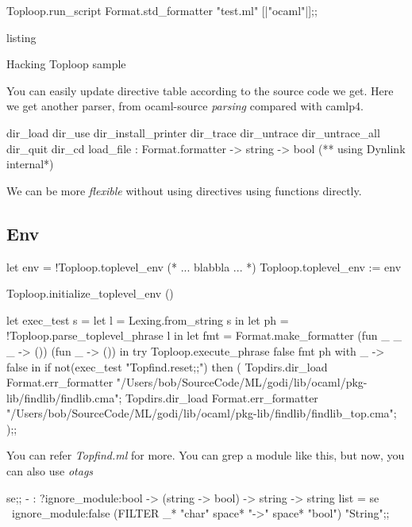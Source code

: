 \begin{ocamlcode}
Toploop.run_script Format.std_formatter "test.ml" [|"ocaml"|];;
\end{ocamlcode}
\caption{listing}{Hacking Toploop sample}

You can easily update directive table according to the source code we
get. Here we get another parser, from ocaml-source \textit{parsing}
compared with camlp4.

\begin{ocamlcode}
  dir_load
  dir_use
  dir_install_printer
  dir_trace
  dir_untrace
  dir_untrace_all
  dir_quit
  dir_cd 
  load_file : Format.formatter -> string -> bool  (** using Dynlink internal*)
\end{ocamlcode}
We can be more \textit{flexible} without using directives using functions directly.


\subsection{Env}

  \begin{ocamlcode}
    let env = !Toploop.toplevel_env
    (* ... blabbla ...     *)
    Toploop.toplevel_env := env  
  \end{ocamlcode}
  
  \begin{ocamlcode}
    Toploop.initialize_toplevel_env ()  
  \end{ocamlcode}


\begin{ocamlcode}
let exec_test s =
  let l = Lexing.from_string s in
  let ph = !Toploop.parse_toplevel_phrase l in
  let fmt = Format.make_formatter (fun _ _ _ -> ()) (fun _ -> ()) in
  try
    Toploop.execute_phrase false fmt ph
  with
      _ -> false
in
if not(exec_test "Topfind.reset;;") then (
  Topdirs.dir_load Format.err_formatter "/Users/bob/SourceCode/ML/godi/lib/ocaml/pkg-lib/findlib/findlib.cma";
  Topdirs.dir_load Format.err_formatter "/Users/bob/SourceCode/ML/godi/lib/ocaml/pkg-lib/findlib/findlib_top.cma";
);;
\end{ocamlcode}
    
You can refer \textit{Topfind.ml} for more. You can grep a module like
this, but now, you can also use \textit{otags}

\begin{ocamlcode}
se;;
- : ?ignore_module:bool -> (string -> bool) -> string -> string list =
se ~ignore_module:false (FILTER _*  "char" space* "->" space* "bool") "String";;
\end{ocamlcode}

